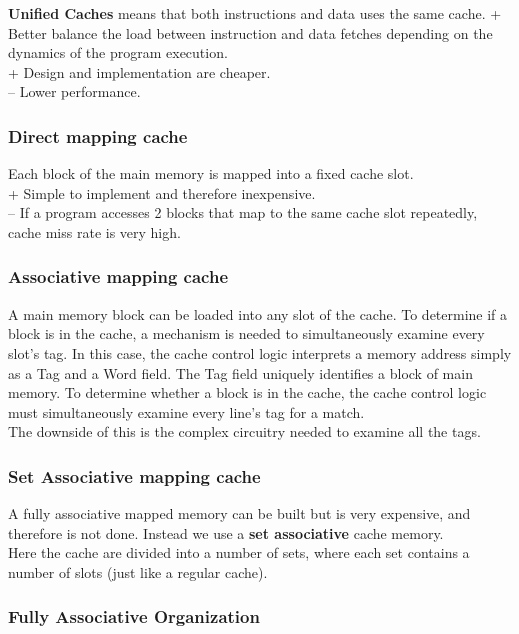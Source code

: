 \documentclass[titlepage, a4paper]{article}
\begin{document}
\textbf{Unified Caches} means that both instructions and data uses the same cache.
+ Better balance the load between instruction and data fetches depending on the dynamics of the program execution. \\
+ Design and implementation are cheaper. \\
-- Lower performance. \\
\subsubsection{Direct mapping cache}
Each block of the main memory is mapped into a fixed cache slot. \\
+ Simple to implement and therefore inexpensive. \\
-- If a program accesses 2 blocks that map to the same cache slot repeatedly, cache miss rate is very high. \\

\subsubsection{Associative mapping cache}
A main memory block can be loaded into any slot of the cache. To determine if a block is in the cache, a mechanism is needed to simultaneously examine every slot’s tag. In this case, the cache control logic interprets a memory address simply as a Tag and a Word field. The Tag field uniquely identifies a block of main memory. To determine whether a block is in the cache, the cache control logic must simultaneously examine every line’s tag for a match. \\

The downside of this is the complex circuitry needed to examine all the tags.

\subsubsection{Set Associative mapping cache}
A fully associative mapped memory can be built but is very expensive, and therefore is not done. Instead we use a \textbf{set associative} cache memory. \\
Here the cache are divided into a number of sets, where each set contains a number of slots (just like a regular cache). 


\subsubsection{Fully Associative Organization}
\end{document}
